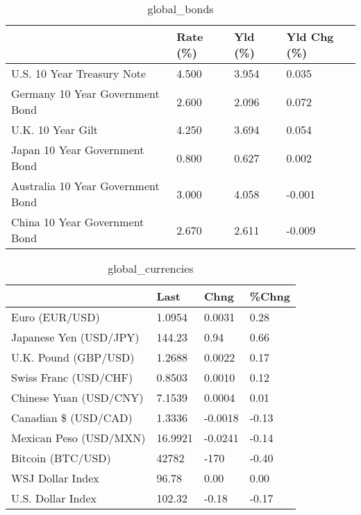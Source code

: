 \documentclass{article}%
\begin{document}
%


\begin{table}[htbp]%
\caption{global\_bonds}%
\centering%
\begin{adjustbox}{width=1\textwidth}%
\begin{tabular}{llll}
\toprule
                                  & Rate (\%) & Yld (\%) & Yld Chg (\%) \\
\midrule
       U.S. 10 Year Treasury Note &    4.500 &   3.954 &       0.035 \\
  Germany 10 Year Government Bond &    2.600 &   2.096 &       0.072 \\
                U.K. 10 Year Gilt &    4.250 &   3.694 &       0.054 \\
    Japan 10 Year Government Bond &    0.800 &   0.627 &       0.002 \\
Australia 10 Year Government Bond &    3.000 &   4.058 &      -0.001 \\
    China 10 Year Government Bond &    2.670 &   2.611 &      -0.009 \\
\bottomrule
\end{tabular}
%
\end{adjustbox}%
\end{table}

%


\begin{table}[htbp]%
\caption{global\_currencies}%
\centering%
\begin{adjustbox}{width=1\textwidth}%
\begin{tabular}{llll}
\toprule
                       &    Last &    Chng & \%Chng \\
\midrule
        Euro (EUR/USD) &  1.0954 &  0.0031 &  0.28 \\
Japanese Yen (USD/JPY) &  144.23 &    0.94 &  0.66 \\
  U.K. Pound (GBP/USD) &  1.2688 &  0.0022 &  0.17 \\
 Swiss Franc (USD/CHF) &  0.8503 &  0.0010 &  0.12 \\
Chinese Yuan (USD/CNY) &  7.1539 &  0.0004 &  0.01 \\
  Canadian \$ (USD/CAD) &  1.3336 & -0.0018 & -0.13 \\
Mexican Peso (USD/MXN) & 16.9921 & -0.0241 & -0.14 \\
     Bitcoin (BTC/USD) &   42782 &    -170 & -0.40 \\
      WSJ Dollar Index &   96.78 &    0.00 &  0.00 \\
     U.S. Dollar Index &  102.32 &   -0.18 & -0.17 \\
\bottomrule
\end{tabular}
%
\end{adjustbox}%
\end{table}
\end{document}
